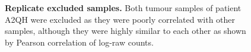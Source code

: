 \begin{figure}[!hb]
  \centering
    \caption[Replicate excluded samples]{\small \textbf{Replicate excluded samples.} Both tumour samples of patient A2QH were excluded as they were poorly correlated with other samples, although they were highly similar to each other as shown by Pearson correlation of log-raw counts.
}
\label{fig:rep_cutcut}
\end{figure}

